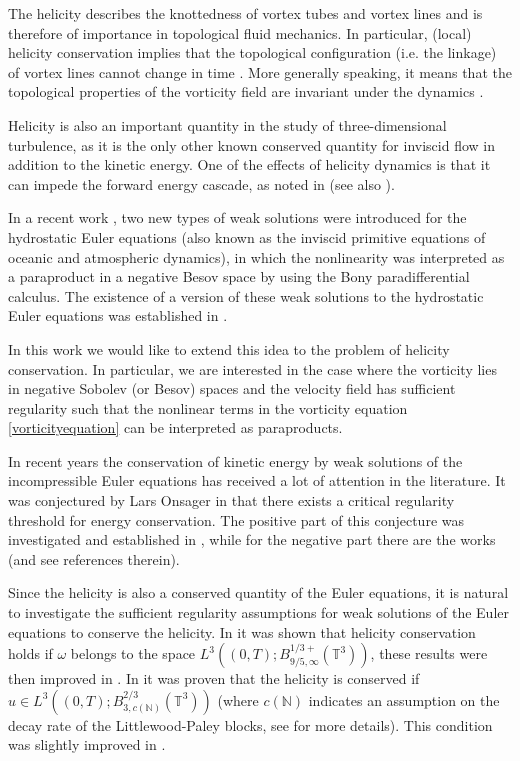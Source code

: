 \documentclass[12pt,a4paper]{article}
\theoremstyle{definition}
\theoremstyle{remark}
\numberwithin{equation}{section}
\begin{document}
The helicity describes the knottedness of vortex tubes and vortex lines and is therefore of importance in topological fluid mechanics. In particular, (local) helicity conservation implies that the topological configuration (i.e. the linkage) of vortex lines cannot change in time \cite{davidson}. More generally speaking, it means that the topological properties of the vorticity field are invariant under the dynamics \cite{moffattreview}. 

Helicity is also an important quantity in the study of three-dimensional turbulence, as it is the only other known conserved quantity for inviscid flow in addition to the kinetic energy. One of the effects of helicity dynamics is that it can impede the forward energy cascade, as noted in \cite{moffatt2014} (see also \cite{yan,biferale2012}). 

In a recent work \cite{boutroshydrostatic}, two new types of weak solutions were introduced for the hydrostatic Euler equations (also known as the inviscid primitive equations of oceanic and atmospheric dynamics), in which the nonlinearity was interpreted as a paraproduct in a negative Besov space by using the Bony paradifferential calculus. The existence of a version of these weak solutions to the hydrostatic Euler equations was established in \cite{boutrosnonuniqueness}.

In this work we would like to extend this idea to the problem of helicity conservation. In particular, we are interested in the case where the vorticity lies in negative Sobolev (or Besov) spaces and the velocity field has sufficient regularity such that the nonlinear terms in the vorticity equation \eqref{vorticityequation} can be interpreted as paraproducts. 

In recent years the conservation of kinetic energy by weak solutions of the incompressible Euler equations has received a lot of attention in the literature. It was conjectured by Lars Onsager in \cite{onsager} that there exists a critical regularity threshold for energy conservation. The positive part of this conjecture was investigated and established in \cite{eyink,constantin,duchon,cheskidovconstantin}, while for the negative part there are the works \cite{lellisinclusion,lellisadmissibility,isettproof,buckmasteradmissible} (and see references therein). 

Since the helicity is also a conserved quantity of the Euler equations, it is natural to investigate the sufficient regularity assumptions for weak solutions of the Euler equations to conserve the helicity. In \cite{chae} it was shown that helicity conservation holds if $\omega$ belongs to the space $L^3 ((0,T); B^{1/3+}_{9/5,\infty} (\mathbb{T}^3))$, these results were then improved in \cite{chaeconserved}. In \cite{cheskidovconstantin} it was proven that the helicity is conserved if $u \in L^3 ((0,T); B^{2/3}_{3,c(\mathbb{N})} (\mathbb{T}^3))$ (where $c (\mathbb{N})$ indicates an assumption on the decay rate of the Littlewood-Paley blocks, see \cite{cheskidovconstantin} for more details). This condition was slightly improved in \cite{wanghelicity}.
\end{document}
